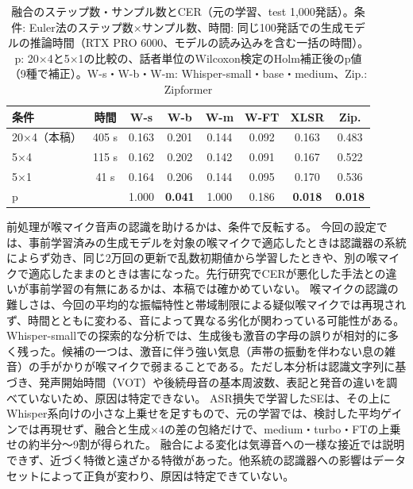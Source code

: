 \documentclass[xelatex,ja=standard,a4paper,twocolumn,10pt]{bxjsarticle}
\makeatletter
\renewcommand{\section}{\@startsection{section}{1}{\z@}{1.0ex plus .3ex}{.5ex}{\normalfont\large\sffamily\bfseries}}
\makeatother
\begin{document}
\begin{table}[t]
  \centering
  \caption{融合のステップ数・サンプル数とCER（元の学習、test 1,000発話）。条件: Euler法のステップ数×サンプル数、時間: 同じ100発話での生成モデルの推論時間（RTX PRO 6000、モデルの読み込みを含む一括の時間）。p: 20×4と5×1の比較の、話者単位のWilcoxon検定のHolm補正後のp値（9種で補正）。W-s・W-b・W-m: Whisper-small・base・medium、Zip.: Zipformer}
  \label{tab:steps}
  \footnotesize
  \setlength{\tabcolsep}{1.6pt}
  \begin{tabular}{lccccccc}
    \toprule
    条件 & 時間 & W-s & W-b & W-m & W-FT & XLSR & Zip. \\
    \midrule
    20×4（本稿） & 405 s & 0.163 & 0.201 & 0.144 & 0.092 & 0.163 & 0.483 \\
    5×4 & 115 s & 0.162 & 0.202 & 0.142 & 0.091 & 0.167 & 0.522 \\
    5×1 & 41 s & 0.164 & 0.206 & 0.144 & 0.095 & 0.170 & 0.536 \\
    p & & 1.000 & \textbf{0.041} & 1.000 & 0.186 & \textbf{0.018} & \textbf{0.018} \\
    \bottomrule
  \end{tabular}
\end{table}

\section{考察と限界}
前処理が喉マイク音声の認識を助けるかは、条件で反転する。
今回の設定では、事前学習済みの生成モデルを対象の喉マイクで適応したときは認識器の系統によらず効き、同じ2万回の更新で乱数初期値から学習したときや、別の喉マイクで適応したままのときは害になった。先行研究\cite{yamanaka2026}でCERが悪化した手法との違いが事前学習の有無にあるかは、本稿では確かめていない。
喉マイクの認識の難しさは、今回の平均的な振幅特性と帯域制限による疑似喉マイクでは再現されず、時間とともに変わる、音によって異なる劣化が関わっている可能性がある。
Whisper-smallでの探索的な分析では、生成後も激音の字母の誤りが相対的に多く残った。候補の一つは、激音に伴う強い気息（声帯の振動を伴わない息の雑音）の手がかりが喉マイクで弱まることである。ただし本分析は認識文字列に基づき、発声開始時間（VOT）や後続母音の基本周波数、表記と発音の違いを調べていないため、原因は特定できない。
ASR損失で学習したSEは、その上にWhisper系向けの小さな上乗せを足すもので、元の学習では、検討した平均ゲインでは再現せず、融合と生成×4の差の包絡だけで、medium・turbo・FTの上乗せの約半分〜9割が得られた。
融合による変化は気導音への一様な接近では説明できず、近づく特徴と遠ざかる特徴があった。他系統の認識器への影響はデータセットによって正負が変わり、原因は特定できていない。
\end{document}
